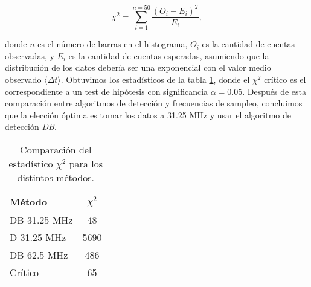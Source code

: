 \begin{equation}
    \chi^2  = \sum_{i=1}^{n=50} \frac{(O_i - E_i)^2}{E_i},
\end{equation}

\noindent donde $n$ es el número de barras en el histograma, $O_i$ es la cantidad de cuentas observadas, y $E_i$ es la cantidad de cuentas esperadas, asumiendo que la distribución de los datos debería ser una exponencial con el valor medio observado $\langle \Delta t \rangle$.
Obtuvimos los estadísticos de la tabla \ref{tab:chisq}, donde el $\chi^2$ crítico es el correspondiente a un test de hipótesis con significancia $\alpha = 0.05$.
Después de esta comparación entre algoritmos de detección y frecuencias de sampleo, concluimos que la elección óptima es tomar los datos a 31.25 MHz y usar el algoritmo de detección \textit{DB}.

\begin{table}[t]
\centering
\begin{tabular}{|l|c|}
    \hline
    \textbf{Método} & \boldmath$\chi^2$ \\
    \hline
    DB 31.25 MHz & 48 \\
    D 31.25 MHz & 5690 \\
    DB 62.5 MHz & 486 \\
    Crítico & 65 \\
    \hline
\end{tabular}
\caption{Comparación del estadístico $\chi^2$ para los distintos métodos.}
\label{tab:chisq}
\end{table}

